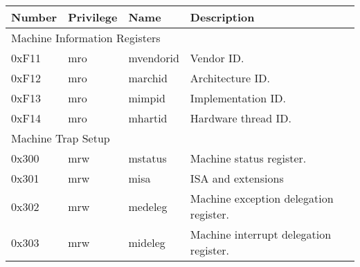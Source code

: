\begin{table}[!ht]
  \centering
  \begin{tabular}{|llll|}
  \hline
  \multicolumn{1}{|l|}{\textbf{Number}} & \multicolumn{1}{l|}{\textbf{Privilege}} & \multicolumn{1}{l|}{\textbf{Name}} & \textbf{Description}                           \\ \hline
  \multicolumn{4}{|l|}{Machine Information Registers}                                                                                                                   \\ \hline
  \multicolumn{1}{|l|}{0xF11}           & \multicolumn{1}{l|}{\acrshort{mro}}                & \multicolumn{1}{l|}{mvendorid}     & Vendor ID.                                     \\ \hline
  \multicolumn{1}{|l|}{0xF12}           & \multicolumn{1}{l|}{\acrshort{mro}}                & \multicolumn{1}{l|}{marchid}       & Architecture ID.                               \\ \hline
  \multicolumn{1}{|l|}{0xF13}           & \multicolumn{1}{l|}{\acrshort{mro}}                & \multicolumn{1}{l|}{mimpid}        & Implementation ID.                             \\ \hline
  \multicolumn{1}{|l|}{0xF14}           & \multicolumn{1}{l|}{\acrshort{mro}}                & \multicolumn{1}{l|}{mhartid}       & Hardware thread ID.                            \\ \hline
  \multicolumn{4}{|l|}{Machine Trap Setup}                                                                                                                              \\ \hline
  \multicolumn{1}{|l|}{0x300}           & \multicolumn{1}{l|}{\acrshort{mrw}}                & \multicolumn{1}{l|}{mstatus}       & Machine status register.                       \\ \hline
  \multicolumn{1}{|l|}{0x301}           & \multicolumn{1}{l|}{\acrshort{mrw}}                & \multicolumn{1}{l|}{misa}          & ISA and extensions                             \\ \hline
  \multicolumn{1}{|l|}{0x302}           & \multicolumn{1}{l|}{\acrshort{mrw}}                & \multicolumn{1}{l|}{medeleg}       & Machine exception delegation register.         \\ \hline
  \multicolumn{1}{|l|}{0x303}           & \multicolumn{1}{l|}{\acrshort{mrw}}                & \multicolumn{1}{l|}{mideleg}       & Machine interrupt delegation register.         \\ \hline

\end{tabular}
\end{table}
